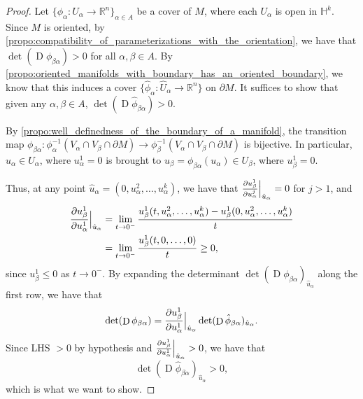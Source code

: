 \documentclass[notoc,notitlepage]{tufte-book}
\DeclareMathOperator{\D}{D}
\begin{document}
\begin{proof}
  Let $\{ \phi_\alpha : U_\alpha \to \mathbb{R}^n \}_{\alpha \in A}$ be a cover of
  $M$, where each $U_\alpha$ is open in $\mathbb{H}^k$. Since $M$ is oriented,
  by \cref{propo:compatibility_of_parameterizations_with_the_orientation}, we
  have that $\det (\D \phi_{\beta\alpha}) > 0$ for all $\alpha, \beta \in A$. By
  \cref{propo:oriented_manifolds_with_boundary_has_an_oriented_boundary}, we
  know that this induces a cover $\{ \hat{\phi}_\alpha : \hat{U}_\alpha \to
  \mathbb{R}^n \}$ on $\partial M$. It suffices to show that given any $\alpha,
  \beta \in A$, $\det(\D \hat{\phi}_{\beta\alpha}) > 0$.

  By \cref{propo:well_definedness_of_the_boundary_of_a_manifold}, the transition
  map $\phi_{\beta\alpha} : \phi_{\alpha}^{-1}(V_\alpha \cap V_\beta \cap
  \partial M) \to \phi_{\beta}^{-1}(V_\alpha \cap V_\beta \cap \partial M)$ is
  bijective. In particular, $u_\alpha \in U_\alpha$, where $u^1_\alpha = 0$ is
  brought to $u_\beta = \phi_{\beta\alpha}(u_\alpha) \in U_\beta$, where
  $u_\beta^1 = 0$.

  Thus, at any point $\hat{u}_\alpha = (0, u_\alpha^2, \ldots, u_\alpha^k)$, we
  have that $\frac{\partial u_\beta^1}{\partial u_\alpha^j}
  \Big|_{\hat{u}_\alpha}^{} = 0$ for $j > 1$, and
  \begin{align*}
    \frac{\partial u_\beta^1}{\partial u_\alpha^1} \Big|_{\hat{u}_\alpha}^{}
    &= \lim_{t \to 0^{-}} \frac{u_\beta^1(t, u_\alpha^2, \ldots, u_\alpha^k) -
    u_\beta^1(0, u_\alpha^2, \ldots, u_\alpha^k)}{t} \\
    &= \lim_{t \to 0^{-}} \frac{u_\beta^1(t, 0, \ldots, 0)}{t} \geq 0,
  \end{align*}
  since $u_\beta^1 \leq 0$ as $t \to 0^-$. By expanding the determinant
  $\det(\D \phi_{\beta\alpha})_{\hat{u}_\alpha}$ along the first row, we
  have that
  \begin{equation*}
    \det(\D \phi_{\beta\alpha}) = \frac{\partial u_\beta^1}{\partial u_\alpha^1}
    \at{\hat{u}_\alpha}{} \det(\D \hat{\phi}_{\beta\alpha})_{\hat{u}_\alpha}.
  \end{equation*}
  Since LHS $> 0$ by hypothesis and $\frac{\partial u_\beta^1}{\partial
  u_\alpha^1}\Big|_{\hat{u}_\alpha}^{} > 0$, we have that 
  \begin{equation*}
    \det(\D \hat{\phi}_{\beta\alpha})_{\hat{u}_\alpha} > 0,
  \end{equation*}
  which is what we want to show.
\end{proof}
\end{document}
